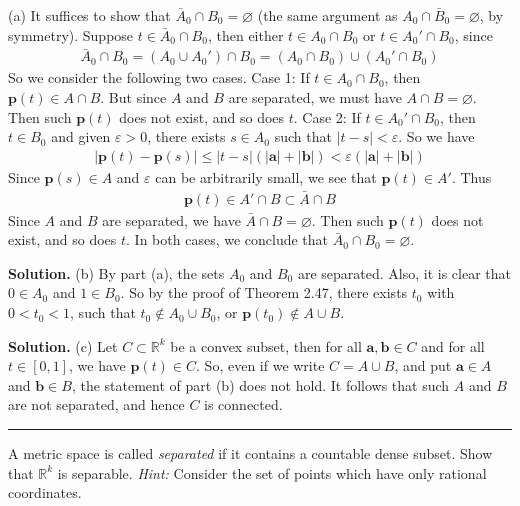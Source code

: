\documentclass[12pt]{article}
\theoremstyle{definition}
\begin{document}
(a) It suffices to show that $\bar{A}_0\cap B_0=\varnothing$ (the same argument as $A_0\cap\bar{B}_0=\varnothing$, by symmetry). Suppose $t\in\bar{A}_0\cap B_0$, then either $t\in A_0\cap B_0$ or $t\in A_0'\cap B_0$, since 
\begin{align*}
\bar{A}_0\cap B_0
=(A_0\cup A_0')\cap B_0
=(A_0\cap B_0)\cup(A_0'\cap B_0)
\end{align*}
So we consider the following two cases.
Case 1: If $t\in A_0\cap B_0$, then $\mathbf{p}(t)\in A\cap B$. But since $A$ and $B$ are separated, we must have $A\cap B=\varnothing$. Then such $\mathbf{p}(t)$ does not exist, and so does $t$.
Case 2: If $t\in A_0'\cap B_0$, then $t\in B_0$ and given $\varepsilon>0$, there exists $s\in A_0$ such that $\left\vert t-s\right\vert<\varepsilon$. So we have
\begin{align*}
\left\vert\mathbf{p}(t)-\mathbf{p}(s)\right\vert
\le\left\vert t-s\right\vert\left(\left\vert\mathbf{a}\right\vert+\left\vert\mathbf{b}\right\vert\right)
<\varepsilon\left(\left\vert\mathbf{a}\right\vert+\left\vert\mathbf{b}\right\vert\right)
\end{align*}
Since $\mathbf{p}(s)\in A$ and $\varepsilon$ can be arbitrarily small, we see that $\mathbf{p}(t)\in A'$. Thus
\begin{align*}
\mathbf{p}(t)
\in A'\cap B
\subset\bar{A}\cap B
\end{align*}
Since $A$ and $B$ are separated, we have $\bar{A}\cap B=\varnothing$. Then such $\mathbf{p}(t)$ does not exist, and so does $t$.
In both cases, we conclude that $\bar{A}_0\cap B_0=\varnothing$.

\smallskip
\noindent\textbf{Solution.}\quad
(b) By part (a), the sets $A_0$ and $B_0$ are separated. Also, it is clear that $0\in A_0$ and $1\in B_0$. So by the proof of Theorem 2.47, there exists $t_0$ with $0<t_0<1$, such that $t_0\notin A_0\cup B_0$, or $\mathbf{p}(t_0)\notin A\cup B$.

\smallskip
\noindent\textbf{Solution.}\quad
(c) Let $C\subset \mathbb{R}^k$ be a convex subset, then for all $\mathbf{a},\mathbf{b}\in C$ and for all $t\in[0,1]$, we have $\mathbf{p}(t)\in C$. So, even if we write $C=A\cup B$, and put $\mathbf{a}\in A$ and $\mathbf{b}\in B$, the statement of part (b) does not hold. It follows that such $A$ and $B$ are not separated, and hence $C$ is connected.



\bigskip\noindent\hrule\bigskip

A metric space is called \textit{separated} if it contains a countable dense subset. Show that $\mathbb{R}^k$ is separable. \textit{Hint:} Consider the set of points which have only rational coordinates.
\end{document}
